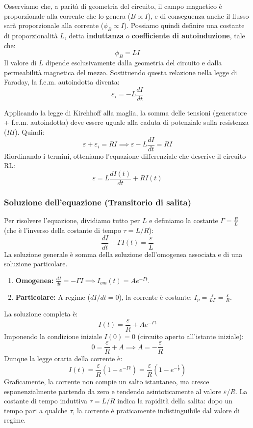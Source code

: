 \documentclass{book}
\begin{document}
Osserviamo che, a parità di geometria del circuito, il campo magnetico è proporzionale alla corrente che lo genera ($B \propto I$), e di conseguenza anche il flusso sarà proporzionale alla corrente ($\phi_B \propto I$).
Possiamo quindi definire una costante di proporzionalità $L$, detta \textbf{induttanza} o \textbf{coefficiente di autoinduzione}, tale che:
$$
\phi_B = L I
$$
Il valore di $L$ dipende esclusivamente dalla geometria del circuito e dalla permeabilità magnetica del mezzo.
Sostituendo questa relazione nella legge di Faraday, la f.e.m. autoindotta diventa:
$$
\varepsilon_i = - L \frac{dI}{dt}
$$

Applicando la legge di Kirchhoff alla maglia, la somma delle tensioni (generatore + f.e.m. autoindotta) deve essere uguale alla caduta di potenziale sulla resistenza ($RI$). Quindi:
$$
\varepsilon + \varepsilon_i = RI \implies \varepsilon - L \frac{dI}{dt} = RI
$$
Riordinando i termini, otteniamo l'equazione differenziale che descrive il circuito RL:
$$
\varepsilon = L \frac{dI(t)}{dt} + R I(t)
$$

\subsubsection{Soluzione dell'equazione (Transitorio di salita)}
Per risolvere l'equazione, dividiamo tutto per $L$ e definiamo la costante $\Gamma = \frac{R}{L}$ (che è l'inverso della costante di tempo $\tau = L/R$):
$$
\frac{dI}{dt} + \Gamma I(t) = \frac{\varepsilon}{L}
$$
La soluzione generale è somma della soluzione dell'omogenea associata e di una soluzione particolare.
\begin{enumerate}
    \item \textbf{Omogenea:} $\frac{dI}{dt} = -\Gamma I \implies I_{om}(t) = A e^{-\Gamma t}$.
    \item \textbf{Particolare:} A regime ($dI/dt=0$), la corrente è costante: $I_p = \frac{\varepsilon}{L\Gamma} = \frac{\varepsilon}{R}$.
\end{enumerate}
La soluzione completa è:
$$
I(t) = \frac{\varepsilon}{R} + A e^{-\Gamma t}
$$
Imponendo la condizione iniziale $I(0)=0$ (circuito aperto all'istante iniziale):
$$
0 = \frac{\varepsilon}{R} + A \implies A = - \frac{\varepsilon}{R}
$$
Dunque la legge oraria della corrente è:
$$
I(t) = \frac{\varepsilon}{R} (1 - e^{-\Gamma t}) = \frac{\varepsilon}{R} (1 - e^{-\frac{t}{\tau}})
$$
Graficamente, la corrente non compie un salto istantaneo, ma cresce esponenzialmente partendo da zero e tendendo asintoticamente al valore $\varepsilon/R$. La costante di tempo induttiva $\tau = L/R$ indica la rapidità della salita: dopo un tempo pari a qualche $\tau$, la corrente è praticamente indistinguibile dal valore di regime.
\end{document}
